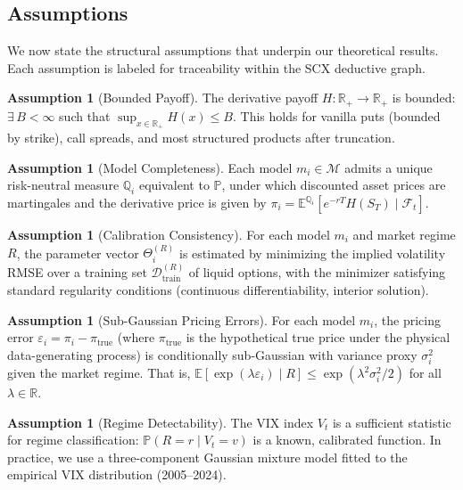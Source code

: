 \documentclass[11pt,a4paper]{article}
\theoremstyle{plain}
\theoremstyle{definition}
\newtheorem{assumption}[theorem]{Assumption}
\theoremstyle{remark}
\newcommand{\R}{\mathbb{R}}
\newcommand{\Rplus}{\mathbb{R}_{+}}
\newcommand{\E}{\mathbb{E}}
\newcommand{\Pbb}{\mathbb{P}}
\newcommand{\F}{\mathcal{F}}
\newcommand{\M}{\mathcal{M}}
\newcommand{\SCX}{\textsc{SCX}}
\newcommand{\riskneutral}{\mathbb{Q}}
\newcommand{\physical}{\mathbb{P}}
\begin{document}
\subsection{Assumptions}

We now state the structural assumptions that underpin our theoretical results. Each assumption is labeled for traceability within the \SCX{} deductive graph.

\begin{assumption}[Bounded Payoff]\label{asm:bounded_payoff}
The derivative payoff $H: \Rplus \to \Rplus$ is bounded: $\exists\, B < \infty$ such that $\sup_{x \in \Rplus} H(x) \leq B$. This holds for vanilla puts (bounded by strike), call spreads, and most structured products after truncation.
\end{assumption}

\begin{assumption}[Model Completeness]\label{asm:model_completeness}
Each model $m_i \in \M$ admits a unique risk-neutral measure $\riskneutral_i$ equivalent to $\physical$, under which discounted asset prices are martingales and the derivative price is given by $\pi_i = \E^{\riskneutral_i}[e^{-rT} H(S_T) \mid \F_t]$.
\end{assumption}

\begin{assumption}[Calibration Consistency]\label{asm:calibration}
For each model $m_i$ and market regime $R$, the parameter vector $\Theta_i^{(R)}$ is estimated by minimizing the implied volatility RMSE over a training set $\mathcal{D}_{\text{train}}^{(R)}$ of liquid options, with the minimizer satisfying standard regularity conditions (continuous differentiability, interior solution).
\end{assumption}

\begin{assumption}[Sub-Gaussian Pricing Errors]\label{asm:subgaussian}
For each model $m_i$, the pricing error $\varepsilon_i = \pi_i - \pi_{\text{true}}$ (where $\pi_{\text{true}}$ is the hypothetical true price under the physical data-generating process) is conditionally sub-Gaussian with variance proxy $\sigma_i^2$ given the market regime. That is, $\E[\exp(\lambda \varepsilon_i) \mid R] \leq \exp(\lambda^2 \sigma_i^2 / 2)$ for all $\lambda \in \R$.
\end{assumption}

\begin{assumption}[Regime Detectability]\label{asm:regime_detect}
The VIX index $V_t$ is a sufficient statistic for regime classification: $\Pbb(R = r \mid V_t = v)$ is a known, calibrated function. In practice, we use a three-component Gaussian mixture model fitted to the empirical VIX distribution (2005--2024).
\end{assumption}
\end{document}
